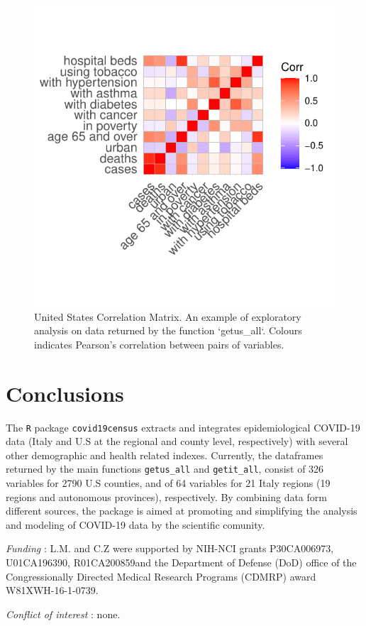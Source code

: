 \documentclass[12pt,halfline,a4paper,]{ouparticle}
\begin{document}
\begin{figure}[p]
\includegraphics[width=1\linewidth]{draft_files/figure-latex/fig_corr-1} \caption{United States Correlation Matrix. An example of exploratory analysis on data returned by the function `getus\_all`. Colours indicates Pearson's correlation between pairs of variables.}\label{fig:fig_corr}
\end{figure}

\hypertarget{conclusions}{%
\section{Conclusions}\label{conclusions}}

The \texttt{R} package \texttt{covid19census} extracts and integrates
epidemiological COVID-19 data (Italy and U.S at the regional and county
level, respectively) with several other demographic and health related
indexes. Currently, the dataframes returned by the main functions
\texttt{getus\_all} and \texttt{getit\_all}, consist of 326 variables
for 2790 U.S counties, and of 64 variables for 21 Italy regions (19
regions and autonomous provinces), respectively. By combining data form
different sources, the package is aimed at promoting and simplifying the
analysis and modeling of COVID-19 data by the scientific comunity.


\begin{notes}[Acknowledgements]
\emph{Funding} : L.M. and C.Z were supported by NIH-NCI grants
P30CA006973, U01CA196390, R01CA200859and the Department of Defense (DoD)
office of the Congressionally Directed Medical Research Programs (CDMRP)
award W81XWH-16-1-0739.

\emph{Conflict of interest} : none.
\end{notes}


\renewcommand\refname{References}


\end{document}
